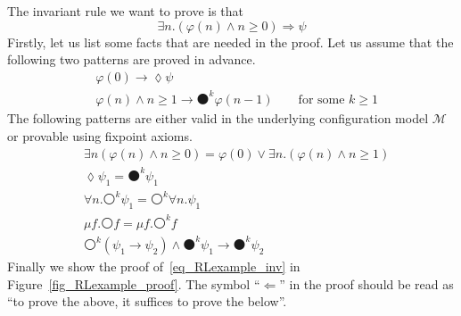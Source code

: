 \documentclass[acmsmall,review,anonymous]{acmart}
\newcommand{\imp}{\to}
\newcommand{\To}{\Rightarrow}
\newcommand{\MM}{\mathcal{M}}
\newcommand{\wnext}{{\medcirc}}
\newcommand{\snext}{{\medbullet}}
\newcommand{\eventually}{{\lozenge}}
\begin{document}
The invariant rule we want to prove is that
\begin{equation}\label{eq_RLexample_inv}
\exists n . (\varphi(n) \wedge n \ge 0) \To \psi \tag{Invariant}
\end{equation}
Firstly, let us list some facts that are needed in the proof.
Let us assume that the following two patterns are proved in advance.
\begin{align}
&\varphi(0) \imp \eventually \psi
\tag{Base Case}\label{eq_RLexample_base_case}
\\
&\varphi(n) \wedge n \ge 1 \imp \snext^k \varphi(n-1)
\qquad \text{for some $k \ge 1$}
\tag{Loop Body}\label{eq_RLexample_loop_body}
\end{align}
The following patterns are either valid in the underlying
configuration model $\MM$ or provable using fixpoint axioms.
\begin{align}
&\exists n (\varphi(n) \wedge n \ge 0) 
 = \varphi(0) \vee \exists n . (\varphi(n) \wedge n \ge 1)
\tag{Domain}\label{eq_RLexample_domain}
\\
&\eventually \psi_1 = \snext^k \psi_1
\tag{Next Eventually}\label{eq_RLexample_next_eventually}
\\
&\forall n . \wnext^k \psi_1 = \wnext^k \forall n . \psi_1
\tag{Comm}\label{eq_RLexample_comm}
\\
&\mu f . \wnext f = \mu f . \wnext^k f
\tag{Fix Next}\label{eq_RLexample_fix_wnext}
\\
&\wnext^k(\psi_1 \imp \psi_2) \wedge \snext^k \psi_1 \imp \snext^k \psi_2
\tag{Progress}\label{eq_RLexample_progress}
\end{align}
Finally we show the proof of~\eqref{eq_RLexample_inv} in 
Figure~\ref{fig_RLexample_proof}.
The symbol ``$\Longleftarrow$'' in the proof should be read as
``to prove the above, it suffices to prove the below''.
\end{document}
